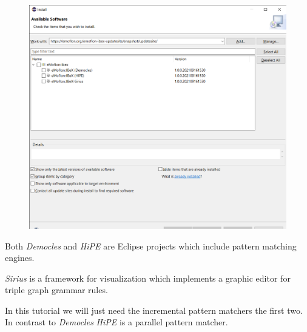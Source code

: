 \begin{figure}[h]
    \centering
    \includegraphics[scale=0.4, width =\textwidth]{pictures/eclipse-workspace - HospitalExample_model_HospitalExample.ecore - Eclipse IDE 08.11.2021 18_02_54.png}
    \caption{}
    \label{screenshot install new software eMoflon::IBeX}
\end{figure}

Both \textsf{\textit{Democles}} and \textsf{\textit{HiPE}} are Eclipse projects which include pattern matching engines.


\textsf{\textit{Sirius}} is a framework for visualization which implements a graphic editor for triple graph grammar rules.\newline 

In this tutorial we will just need the incremental pattern matchers the first two. In contrast to \textsf{\textit{Democles}} \textsf{\textit{HiPE}} is a parallel pattern matcher.

\clearpage